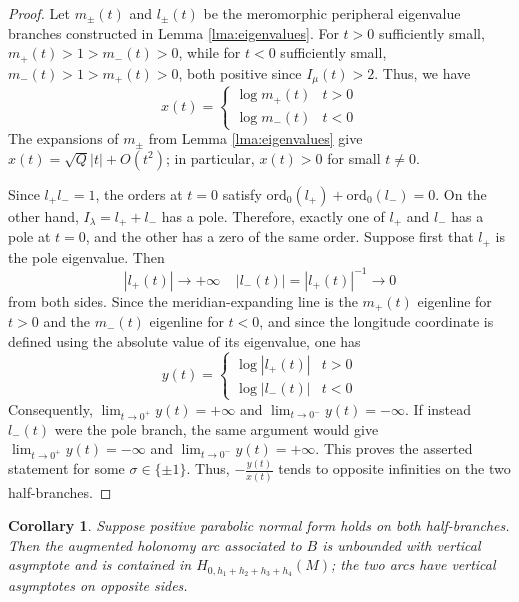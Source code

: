 \documentclass{article}
\theoremstyle{plain}
\theoremstyle{definition}
\theoremstyle{plain}
\theoremstyle{plain}
\newtheorem{corollary}[theorem]{Corollary}
\theoremstyle{plain}
\theoremstyle{remark}
\theoremstyle{remark}
\theoremstyle{plain}
\theoremstyle{plain}
\theoremstyle{plain}
\theoremstyle{plain}
\begin{document}
\begin{proof}
Let $m_\pm(t)$ and $l_\pm(t)$ be the meromorphic peripheral eigenvalue branches constructed in Lemma \ref{lma:eigenvalues}. For $t > 0$ sufficiently small, $m_+(t) > 1 > m_-(t) > 0$, while for $t < 0$ sufficiently small, $m_-(t) > 1 > m_+(t) > 0$, both positive since $I_\mu(t) > 2$. Thus, we have 
\begin{equation*}
	x(t) = \begin{cases}\log m_+(t) & t > 0 \\ \log m_-(t) & t < 0\end{cases} 
\end{equation*}
The expansions of $m_\pm$ from Lemma \ref{lma:eigenvalues} give $x(t) = \sqrt{Q}|t| + O(t^2)$; in particular, $x(t) > 0$ for small $t \neq 0$. 

\medskip

Since $l_+l_- = 1$, the orders at $t = 0$ satisfy $\mathrm{ord}_0(l_+) + \mathrm{ord}_0(l_-) = 0$. On the other hand, $I_\lambda = l_+ + l_-$ has a pole. Therefore, exactly one of $l_+$ and $l_-$ has a pole at $t = 0$, and the other has a zero of the same order. Suppose first that $l_+$ is the pole eigenvalue. Then 
\begin{equation*}
	|l_+(t)| \to +\infty \ \ \ \ \ |l_-(t)| = |l_+(t)|^{-1} \to 0
\end{equation*}
from both sides. Since the meridian-expanding line is the $m_+(t)$ eigenline for $t > 0$ and the $m_-(t)$ eigenline for $t < 0$, and since the longitude coordinate is defined using the absolute value of its eigenvalue, one has
\begin{equation*}
	y(t) = 
	\begin{cases} \log |l_+(t)|&t>0 \\ \log |l_-(t)|&t<0\end{cases}
\end{equation*}
Consequently, $\lim_{t \to 0^+}y(t) = +\infty$ and $\lim_{t \to 0^-}y(t) = -\infty$. If instead $l_-(t)$ were the pole branch, the same argument would give $\lim_{t \to 0^+}y(t) = -\infty$ and $\lim_{t \to 0^-}y(t) = +\infty$. This proves the asserted statement for some $\sigma\in\{\pm1\}$. Thus, $-\frac{y(t)}{x(t)}$ tends to opposite infinities on the two half-branches.
\end{proof}

\begin{corollary}\label{cor:sheets}
Suppose positive parabolic normal form holds on both half-branches. Then the augmented holonomy arc associated to $B$ is unbounded with vertical asymptote and is contained in $H_{0,h_1+h_2+h_3+h_4}(M)$; the two arcs have vertical asymptotes on opposite sides.
\end{corollary}
\end{document}
